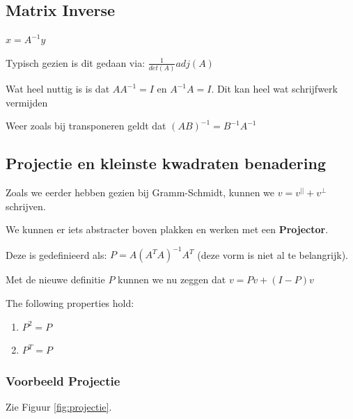 \documentclass[a4paper]{article}
\begin{document}
\subsection{Matrix Inverse}

$x = A^{-1} y$

Typisch gezien is dit gedaan via: $\frac{1}{det(A)} adj(A)$

Wat heel nuttig is is dat $A A^{-1} = I$ en $A^{-1} A = I$. Dit kan heel wat schrijfwerk vermijden

Weer zoals bij transponeren geldt dat $(AB)^{-1} = B^{-1} A^{-1}$

\subsection{Projectie en kleinste kwadraten benadering}

Zoals we eerder hebben gezien bij Gramm-Schmidt, kunnen we $v= v^{||} + v^{\perp}$ schrijven.

We kunnen er iets abstracter boven plakken en werken met een \textbf{Projector}.

Deze is gedefinieerd als: $P = A (A^T A)^{-1} A^T$ (deze vorm is niet al te belangrijk).

Met de nieuwe definitie $P$ kunnen we nu zeggen dat $v = Pv + (I - P)v$

The following properties hold:

\begin{enumerate}
	\item $P^2 = P$
	\item $P^T = P$
\end{enumerate}

\subsubsection{Voorbeeld Projectie}

Zie Figuur \ref{fig:projectie}.
\end{document}
